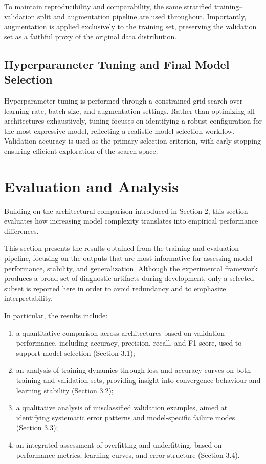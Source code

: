 \documentclass{article}
\begin{document}
To maintain reproducibility and comparability, the same stratified training–validation split and augmentation pipeline are used throughout. Importantly, augmentation is applied exclusively to the training set, preserving the validation set as a faithful proxy of the original data distribution.

\subsection{Hyperparameter Tuning and Final Model Selection}

Hyperparameter tuning is performed through a constrained grid search over learning rate, batch size, and augmentation settings. Rather than optimizing all architectures exhaustively, tuning focuses on identifying a robust configuration for the most expressive model, reflecting a realistic model selection workflow. Validation accuracy is used as the primary selection criterion, with early stopping ensuring efficient exploration of the search space.
\section{Evaluation and Analysis}

Building on the architectural comparison introduced in Section 2, this
section evaluates how increasing model complexity translates into
empirical performance differences.

This section presents the results obtained from the training and
evaluation pipeline, focusing on the outputs that are most informative
for assessing model performance, stability, and generalization. Although
the experimental framework produces a broad set of diagnostic artifacts
during development, only a selected subset is reported here in order to
avoid redundancy and to emphasize interpretability.

In particular, the results include:


\begin{enumerate}
\def\labelenumi{\roman{enumi}.}
\item
  a quantitative comparison across architectures based on validation
  performance, including accuracy, precision, recall, and F1-score, used
  to support model selection (Section 3.1);
\item
  an analysis of training dynamics through loss and accuracy curves on
  both training and validation sets, providing insight into convergence
  behaviour and learning stability (Section 3.2);
\item
  a qualitative analysis of misclassified validation examples, aimed at
  identifying systematic error patterns and model-specific failure modes
  (Section 3.3);
\item
  an integrated assessment of overfitting and underfitting, based on
  performance metrics, learning curves, and error structure (Section
  3.4).
\end{enumerate}
\end{document}
